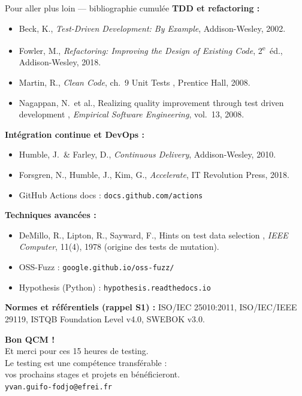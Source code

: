 \documentclass[aspectratio=169,11pt]{beamer}
\begin{document}
\begin{frame}[t]{Pour aller plus loin --- bibliographie cumulée}
\scriptsize
\textbf{TDD et refactoring :}
\begin{itemize}\itemsep0.1em
\item Beck, K., \emph{Test-Driven Development: By Example}, Addison-Wesley, 2002.
\item Fowler, M., \emph{Refactoring: Improving the Design of Existing Code}, 2\textsuperscript{e}~éd., Addison-Wesley, 2018.
\item Martin, R., \emph{Clean Code}, ch.~9 \og Unit Tests \fg, Prentice Hall, 2008.
\item Nagappan, N.\ et al., \og Realizing quality improvement through test driven development \fg, \emph{Empirical Software Engineering}, vol.~13, 2008.
\end{itemize}
\vspace{0.3em}
\textbf{Intégration continue et DevOps :}
\begin{itemize}\itemsep0.1em
\item Humble, J.\ \& Farley, D., \emph{Continuous Delivery}, Addison-Wesley, 2010.
\item Forsgren, N., Humble, J., Kim, G., \emph{Accelerate}, IT Revolution Press, 2018.
\item GitHub Actions docs : \texttt{docs.github.com/actions}
\end{itemize}
\vspace{0.3em}
\textbf{Techniques avancées :}
\begin{itemize}\itemsep0.1em
\item DeMillo, R., Lipton, R., Sayward, F., \og Hints on test data selection \fg, \emph{IEEE Computer}, 11(4), 1978 (origine des tests de mutation).
\item OSS-Fuzz : \texttt{google.github.io/oss-fuzz/}
\item Hypothesis (Python) : \texttt{hypothesis.readthedocs.io}
\end{itemize}
\vspace{0.3em}
\textbf{Normes et référentiels (rappel S1) :} ISO/IEC 25010:2011, ISO/IEC/IEEE 29119, ISTQB Foundation Level v4.0, SWEBOK v3.0.
\end{frame}

\begin{frame}[plain]
\vspace{1.8cm}
\centering
{\color{white}\Huge\bfseries Bon QCM !}\\[0.5cm]
{\color{white}\large Et merci pour ces 15 heures de testing.}\\[1.4cm]
{\color{white!85}\small Le testing est une compétence transférable :\\
vos prochains stages et projets en bénéficieront.}\\[0.5cm]
{\color{white!75}\scriptsize \texttt{yvan.guifo-fodjo@efrei.fr}}
\vfill
\end{frame}
\end{document}
